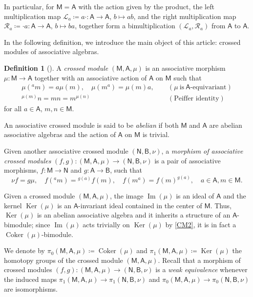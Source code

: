 \documentclass[12pt,reqno]{amsart}
\theoremstyle{plain}
\theoremstyle{definition}
\newtheorem{definition}[theorem]{Definition}
\theoremstyle{remark}
\def\Ker{\operatorname{Ker}}
\def\Im{\operatorname{Im}}
\def\Coker{\operatorname{Coker}}
\newcommand{\A}{\ensuremath{\mathsf{A}}}
\newcommand{\B}{\ensuremath{\mathsf{B}}}
\newcommand{\MM}{\ensuremath{\mathsf{M}}}
\newcommand{\NN}{\ensuremath{\mathsf{N}}}
\newcommand{\LL}{\ensuremath{\mathcal{L}}}
\newcommand{\RR}{\ensuremath{\mathcal{R}}}
\numberwithin{equation}{section}
\begin{document}
In particular, for $\MM=\A$ with the action given by the product, the left multiplication map $\LL_a \coloneqq a \cdot \colon  \A \to \A$, $b \mapsto ab$, 
and  the  right multiplication map $\RR_a \coloneqq \cdot a  \colon  \A \to \A$, $b \mapsto ba$, together form a bimultiplication $(\LL_a,\RR_a)$  from $\A$ to $\A$.


In the following definition, we introduce the main object of this article: crossed modules of associative algebras.
\begin{definition}[\cite{DL,Ger}]
	A \emph{crossed module} $(\MM,\A,\mu)$ is an associative morphism $\mu \colon \MM\to\A$ together with an associative action of $\A$ on $\MM$ such that
\begin{align}
\mu({}^am)=a\mu(m), \quad \mu(m^a)=\mu(m)a, \quad &  \  (\mu \  \text{is}  \ \A\text{-equivariant}) \label{CM1} \tag{CM1}\\
^{\mu(m)}n=m n=m^{\mu(n)}    \quad &  \  (\text{Peiffer identity}) \label{CM2}\tag{CM2}
\end{align}
for all $a\in \A$, $m, n\in \MM$.

An associative crossed module is said to be \emph{abelian} if both $\MM$ and $\A$ are abelian associative algebras and the action of $\A$ on $\MM$ is trivial.

Given another associative crossed module $(\NN,\B,\nu)$, a \emph{morphism of associative crossed modules} 
$(f,g) \colon  (\MM,\A,\mu) \to (\NN,\B,\nu)$ is a pair of associative morphisms, $f \colon  \MM \to \NN$  and 
$g \colon  \A \to \B$, such that 
\begin{equation}\label{morasoxmod}
	 \nu f = g \mu, \quad f(^am)=  {}^{g(a)}f(m), \quad f(m^a)=  f(m)^{g(a)},  \quad a \in \A, m \in \MM.
\end{equation}
\end{definition}

Given a crossed module  $(\MM,\A,\mu)$, the image  $\Im(\mu)$ is an  ideal of $\A$  
and the kernel $\Ker(\mu)$ is an $\A$-invariant  ideal contained in the center of $\MM$. Thus, $\Ker(\mu)$ is an abelian associative algebra and it inherits a structure of an $\A$-bimodule;
 since $\Im(\mu)$ acts trivially on $\Ker(\mu)$ by \eqref{CM2}, it is in fact a $\Coker(\mu)$-bimodule.

We denote by $\pi_0(\MM,\A,\mu)\coloneqq\Coker(\mu)$ and $\pi_1(\MM,\A,\mu)\coloneqq \Ker(\mu)$ the homotopy groups of the crossed module $(\MM,\A,\mu)$. Recall that a morphism of crossed modules
$(f,g) \colon  (\MM,\A,\mu) \to (\NN,\B,\nu)$
is a \emph{weak equivalence} whenever the induced maps $\pi_1(\MM,\A,\mu) \to \pi_1(\NN,\B,\nu)$ and $\pi_0(\MM,\A,\mu) \to \pi_0(\NN,\B,\nu)$ are isomorphisms.
 
\end{document}
